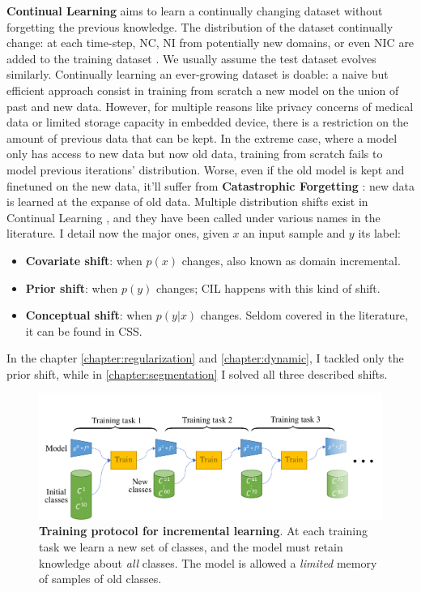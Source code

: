 \textbf{Continual Learning} aims to learn a continually changing dataset without forgetting the
previous knowledge. The distribution of the dataset continually change: at each time-step, \ac{NC},
\ac{NI} from potentially new domains, or even \ac{NIC} are added to the training dataset
\cite{lomonaco2017core50}. We usually assume the test dataset evolves similarly. Continually
learning an ever-growing dataset is doable: a naive but efficient approach consist in training from
scratch a new model on the union of past and new data. However, for multiple reasons like privacy
concerns of medical data or limited storage capacity in embedded device, there is a restriction on
the amount of previous data that can be kept. In the extreme case, where a model only has access to
new data but now old data, training from scratch fails to model previous iterations' distribution.
Worse, even if the old model is kept and finetuned on the new data, it'll suffer from
\textbf{Catastrophic Forgetting} \citep{robins1995catastrophicforgetting}: new data is learned at
the expanse of old data. Multiple distribution shifts exist in Continual Learning
\citep{morenotorresa2012datasetshift,lesort2021driftanalysis}, and they have been called under various names in the
literature. I detail now the major ones, given $x$ an input sample and $y$ its label:

\begin{itemize}
      \item \textbf{Covariate shift}: when $p(x)$ changes, also known as domain incremental.
      \item \textbf{Prior shift}: when $p(y)$ changes; \ac{CIL} happens with this kind of shift.
      \item \textbf{Conceptual shift}: when $p(y | x)$ changes. Seldom covered in the literature, it
            can be found in \acf{CSS}.
\end{itemize}

In the chapter \autoref{chapter:regularization} and \autoref{chapter:dynamic}, I tackled only the
prior shift, while in \autoref{chapter:segmentation} I solved all three described shifts.

\begin{figure}[tb]
      \begin{center}
            \includegraphics[width=1.0\linewidth]{images/related/protocol}
      \end{center}
      \caption{\textbf{Training protocol for incremental learning}. At each training task we learn a
            new set of classes, and the model must retain knowledge about \textit{all} classes. The
            model is allowed a \textit{limited} memory of samples of old classes.}
      \label{fig:related_protocol}
\end{figure}

